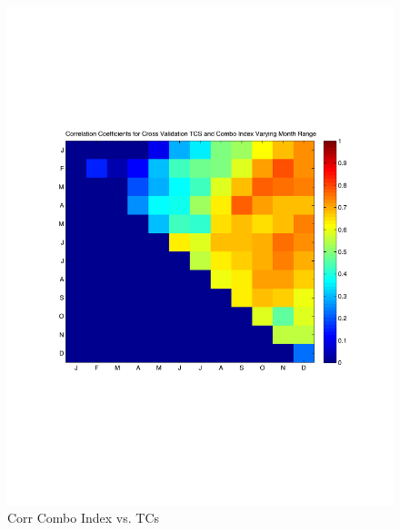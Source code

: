\documentclass[]{article}
\begin{document}
\begin{figure}[ht]
\begin{minipage}[b]{0.6\linewidth}
\includegraphics[width=\textwidth]{figures/comboIndex/crossValidation/monthlySensitivityTestTCS.pdf}
\caption{Corr Combo Index vs. TCs}
\label{fig:figure41}
\end{minipage}
\hspace{0cm}
\begin{minipage}[b]{0.6\linewidth}
\end{minipage}
\end{figure}


\end{document}
